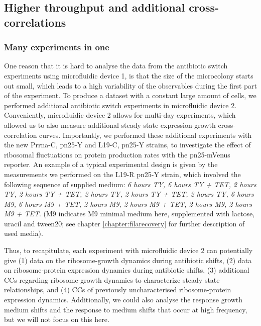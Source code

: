 \subsection{Higher throughput and additional cross-correlations}

\subsubsection{Many experiments in one}

One reason that it is hard to analyse the data from the antibiotic switch experiments using microfluidic device 1, 
is
that the size of the microcolony starts out small, which leads to a 
high variability of the observables during the first part of the experiment.
%
To produce a dataset with a constant large amount of cells, we performed additional antibiotic switch experiments in microfluidic device 2.
%
Conveniently, microfluidic device 2 allows for multi-day experiments, which allowed us 
to also measure additional steady state expression-growth cross-correlation curves. %
%
Importantly, we performed these additional experiments with the new Prrna-C, pn25-Y and L19-C, pn25-Y strains, to investigate the effect of ribosomal fluctuations on protein production rates with the pn25-mVenus reporter.
%
An example of a typical 
experimental design is given by the measurements we performed on the L19-R pn25-Y strain, which involved the following sequence of supplied medium: \textit{6 hours TY, 6 hours TY + TET, 2 hours TY, 2 hours TY + TET, 2 hours TY, 2 hours TY + TET, 2 hours TY, 6 hours M9, 6 hours M9 + TET, 2 hours M9, 2 hours M9 + TET, 2 hours M9, 2 hours M9 + TET}. (M9 indicates M9 minimal medium here, supplemented with lactose, uracil and tween20; see chapter \ref{chapter:filarecovery} for further description of used media). 
%

Thus, to recapitulate, each experiment with microfluidic device 2 can potentially give (1) data on the ribosome-growth dynamics during antibiotic shifts, (2) data on ribosome-protein expression dynamics during antibiotic shifts, (3) additional CCs regarding ribosome-growth dynamics to characterize steady state relationships, and (4) CCs of previously uncharacterised ribosome-protein expression dynamics. 
Additionally, we could also analyse the response growth medium shifts and the response to medium shifts that occur at high frequency, but we will not focus on this here.


